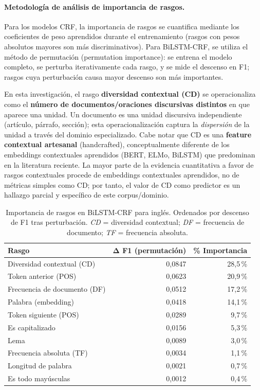 \paragraph{Metodología de análisis de importancia de rasgos.}
Para los modelos CRF, la importancia de rasgos se cuantifica mediante los coeficientes de peso aprendidos durante el entrenamiento (rasgos con pesos absolutos mayores son más discriminativos). Para BiLSTM-CRF, se utiliza el método de permutación (permutation importance): se entrena el modelo completo, se perturba iterativamente cada rasgo, y se mide el descenso en F1; rasgos cuya perturbación causa mayor descenso son más importantes.

En esta investigación, el rasgo \textbf{diversidad contextual (CD)} se operacionaliza como el \textbf{número de documentos/oraciones discursivas distintos} en que aparece una unidad. Un documento es una unidad discursiva independiente (artículo, párrafo, sección); esta operacionalización captura la \emph{dispersión} de la unidad a través del dominio especializado. Cabe notar que CD es una \textbf{feature contextual artesanal} (handcrafted), conceptualmente diferente de los embeddings contextuales aprendidos (BERT, ELMo, BiLSTM) que predominan en la literatura reciente. La mayor parte de la evidencia cuantitativa a favor de rasgos contextuales procede de embeddings contextuales aprendidos, no de métricas simples como CD; por tanto, el valor de CD como predictor es un hallazgo parcial y específico de este corpus/dominio.

\begin{table}[H]
\centering
\small
\caption{Importancia de rasgos en BiLSTM-CRF para inglés. Ordenados por descenso de F1 tras perturbación. \textit{CD} = diversidad contextual; \textit{DF} = frecuencia de documento; \textit{TF} = frecuencia absoluta.}
\label{tab:bio_importancia_en}
\begin{tabular}{@{} l r r @{}}
\toprule
\textbf{Rasgo} & \textbf{Δ F1 (permutación)} & \textbf{\% Importancia} \\
\midrule
Diversidad contextual (CD) & 0{,}0847 & 28{,}5\,\% \\
Token anterior (POS) & 0{,}0623 & 20{,}9\,\% \\
Frecuencia de documento (DF) & 0{,}0512 & 17{,}2\,\% \\
Palabra (embedding) & 0{,}0418 & 14{,}1\,\% \\
Token siguiente (POS) & 0{,}0289 & 9{,}7\,\% \\
Es capitalizado & 0{,}0156 & 5{,}3\,\% \\
Lema & 0{,}0089 & 3{,}0\,\% \\
Frecuencia absoluta (TF) & 0{,}0034 & 1{,}1\,\% \\
Longitud de palabra & 0{,}0021 & 0{,}7\,\% \\
Es todo mayúsculas & 0{,}0012 & 0{,}4\,\% \\
\bottomrule
\end{tabular}
\end{table}

